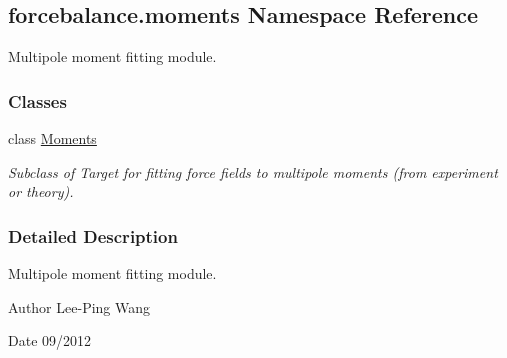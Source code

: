\hypertarget{namespaceforcebalance_1_1moments}{\subsection{forcebalance.\-moments Namespace Reference}
\label{namespaceforcebalance_1_1moments}
}


Multipole moment fitting module.  


\subsubsection*{Classes}
\begin{DoxyCompactItemize}
\item 
class \hyperlink{classforcebalance_1_1moments_1_1Moments}{Moments}
\begin{DoxyCompactList}\small\item\em Subclass of Target for fitting force fields to multipole moments (from experiment or theory). \end{DoxyCompactList}\end{DoxyCompactItemize}


\subsubsection{Detailed Description}
Multipole moment fitting module. \begin{DoxyAuthor}{Author}
Lee-\/\-Ping Wang 
\end{DoxyAuthor}
\begin{DoxyDate}{Date}
09/2012 
\end{DoxyDate}
